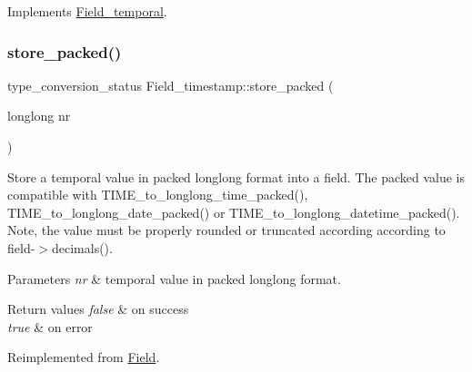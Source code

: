 Implements \mbox{\hyperlink{classField__temporal_a21c90848108fc5d00bad242efce2b490}{Field\+\_\+temporal}}.

\mbox{\label{classField__timestamp_aed9a6035937206a33864b8a6124791ee}} 
\subsubsection{\texorpdfstring{store\+\_\+packed()}{store\_packed()}}
{\footnotesize\ttfamily type\+\_\+conversion\+\_\+status Field\+\_\+timestamp\+::store\+\_\+packed (\begin{DoxyParamCaption}\item[{longlong}]{nr }\end{DoxyParamCaption})\hspace{0.3cm}{\ttfamily [virtual]}}

Store a temporal value in packed longlong format into a field. The packed value is compatible with T\+I\+M\+E\+\_\+to\+\_\+longlong\+\_\+time\+\_\+packed(), T\+I\+M\+E\+\_\+to\+\_\+longlong\+\_\+date\+\_\+packed() or T\+I\+M\+E\+\_\+to\+\_\+longlong\+\_\+datetime\+\_\+packed(). Note, the value must be properly rounded or truncated according according to field-\/$>$decimals().


\begin{DoxyParams}{Parameters}
{\em nr} & temporal value in packed longlong format. \\
\hline
\end{DoxyParams}

\begin{DoxyRetVals}{Return values}
{\em false} & on success \\
\hline
{\em true} & on error \\
\hline
\end{DoxyRetVals}


Reimplemented from \mbox{\hyperlink{classField_a5c09752e8441d64ce2e4e611508bab7a}{Field}}.

\mbox{\label{classField__timestamp_a3dfb1ebf99c1e7da4296ddb6751deb91}} 

